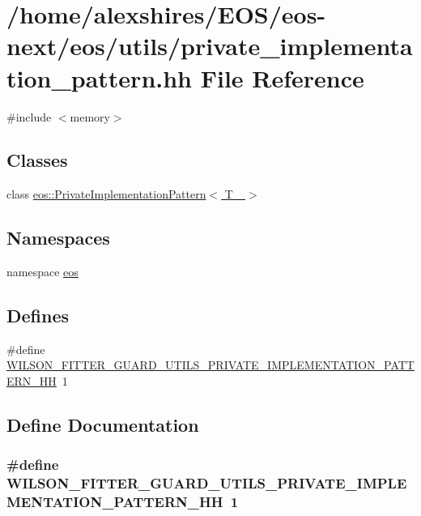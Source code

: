 \hypertarget{private__implementation__pattern_8hh}{
\section{/home/alexshires/EOS/eos-\/next/eos/utils/private\_\-implementation\_\-pattern.hh File Reference}
\label{private__implementation__pattern_8hh}
}
{\ttfamily \#include $<$memory$>$}\par
\subsection*{Classes}
\begin{DoxyCompactItemize}
\item 
class \hyperlink{classeos_1_1PrivateImplementationPattern}{eos::PrivateImplementationPattern$<$ T\_\- $>$}
\end{DoxyCompactItemize}
\subsection*{Namespaces}
\begin{DoxyCompactItemize}
\item 
namespace \hyperlink{namespaceeos}{eos}
\end{DoxyCompactItemize}
\subsection*{Defines}
\begin{DoxyCompactItemize}
\item 
\#define \hyperlink{private__implementation__pattern_8hh_a5efbe66a4abd663a38be294484095169}{WILSON\_\-FITTER\_\-GUARD\_\-UTILS\_\-PRIVATE\_\-IMPLEMENTATION\_\-PATTERN\_\-HH}~1
\end{DoxyCompactItemize}


\subsection{Define Documentation}
\hypertarget{private__implementation__pattern_8hh_a5efbe66a4abd663a38be294484095169}{
\subsubsection[{WILSON\_\-FITTER\_\-GUARD\_\-UTILS\_\-PRIVATE\_\-IMPLEMENTATION\_\-PATTERN\_\-HH}]{\setlength{\rightskip}{0pt plus 5cm}\#define WILSON\_\-FITTER\_\-GUARD\_\-UTILS\_\-PRIVATE\_\-IMPLEMENTATION\_\-PATTERN\_\-HH~1}}
\label{private__implementation__pattern_8hh_a5efbe66a4abd663a38be294484095169}
